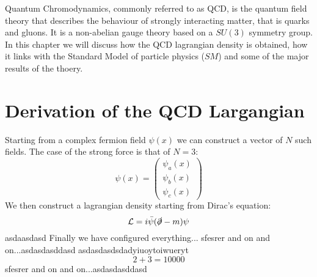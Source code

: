 Quantum Chromodynamics, commonly referred to as QCD, is the quantum field theory that describes the behaviour of strongly interacting matter, that is quarks and gluons. It is a non-abelian gauge theory based on a $SU(3)$ symmetry group. In this chapter we will discuss how the QCD lagrangian density is obtained, how it links with the Standard Model of particle physics ($SM$) and some of the major results of the thoery. \cite{peskin}

\section{Derivation of the QCD Largangian}
Starting from a complex fermion field $\psi(x)$ we can construct a vector of $N$ such fields. The case of the strong force is that of $N=3$:
\begin{equation}
  \psi(x) = \begin{pmatrix}
      \psi_a(x)\\
      \psi_b(x)\\
      \psi_c(x)
  \end{pmatrix}
\end{equation}
We then construct a lagrangian density starting from Dirac's equation:
\begin{equation}
  \mathcal{L} = i\bar{\psi}(\slashed{\partial} - m )\psi
\end{equation}asdaasdasd
Finally we have configured everything...
sfesrer and on and on...asdasdasddasd
asdasdasdsdadyiuoytoiwueryt
\begin{equation}
  2+3=10000
\end{equation}
sfesrer and on and on...asdasdasddasd
